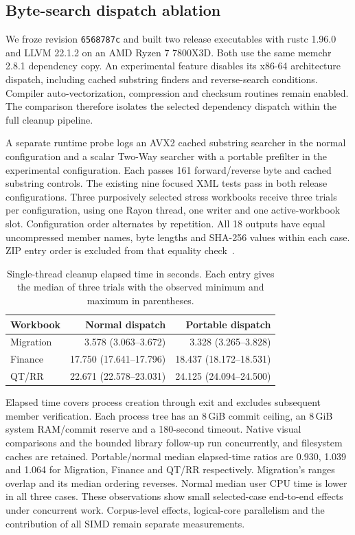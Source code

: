 \subsection{Byte-search dispatch ablation}
\label{sec:search-dispatch-ablation}
We froze revision \texttt{6568787c} and built two release executables with
rustc 1.96.0 and LLVM 22.1.2 on an AMD Ryzen 7 7800X3D. Both use the same
memchr 2.8.1 dependency copy. An experimental feature disables its x86-64
architecture dispatch, including cached substring finders and reverse-search
conditions. Compiler auto-vectorization, compression and checksum routines
remain enabled. The comparison therefore isolates the selected dependency
dispatch within the full cleanup pipeline.

A separate runtime probe logs an AVX2 cached substring searcher in the normal
configuration and a scalar Two-Way searcher with a portable prefilter in the
experimental configuration. Each passes 161 forward/reverse byte and cached
substring controls. The existing nine focused XML tests pass in both release
configurations. Three purposively selected stress workbooks receive three trials
per configuration, using one Rayon thread, one writer and one active-workbook
slot. Configuration order alternates by repetition. All 18 outputs have equal
uncompressed member names, byte lengths and SHA-256 values within each case.
ZIP entry order is excluded from that equality check~\cite{searchdispatchartifact}.

\begin{table}[t]
\caption{Single-thread cleanup elapsed time in seconds. Each entry gives the
median of three trials with the observed minimum and maximum in parentheses.}
\label{tab:search-dispatch-ablation}
\centering
\setlength{\tabcolsep}{3pt}
\begin{tabular}{lrr}
\hline
Workbook & Normal dispatch & Portable dispatch \\
\hline
Migration & 3.578 (3.063--3.672) & 3.328 (3.265--3.828) \\
Finance & 17.750 (17.641--17.796) & 18.437 (18.172--18.531) \\
QT/RR & 22.671 (22.578--23.031) & 24.125 (24.094--24.500) \\
\hline
\end{tabular}
\end{table}

Elapsed time covers process creation through exit and excludes subsequent
member verification. Each process tree has an 8\,GiB commit ceiling, an
8\,GiB system RAM/commit reserve and a 180-second timeout. Native visual
comparisons and the bounded library follow-up run concurrently, and filesystem
caches are retained. Portable/normal median elapsed-time ratios are 0.930,
1.039 and 1.064 for Migration, Finance and QT/RR respectively. Migration's
ranges overlap and its median ordering reverses. Normal median user CPU time
is lower in all three cases. These observations show small selected-case
end-to-end effects under concurrent work. Corpus-level effects, logical-core
parallelism and the contribution of all SIMD remain separate measurements.
